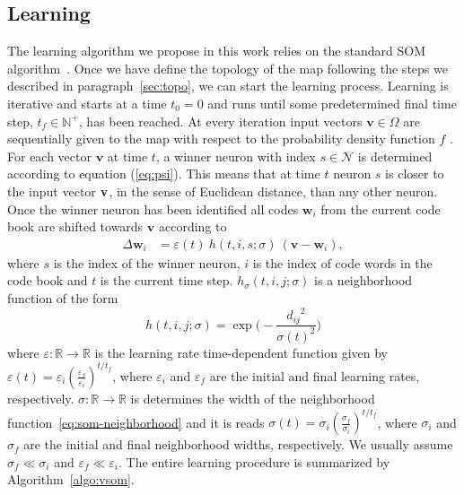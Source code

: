\subsection{Learning}

The learning algorithm we propose in this work relies on the standard SOM 
algorithm~\citep{Kohonen:1982}. Once we have define the topology of the map
following the steps we described in paragraph~\ref{sec:topo}, we can start 
the learning process. Learning is iterative and starts at a time $t_0=0$ and
runs until some predetermined final time step, $t_f \in \mathbb{N}^+$, has been 
reached. At every iteration input vectors $\mathbf{v} \in \Omega$ are 
sequentially given to the
map with respect to the probability density function $f$ .
For each vector $\mathbf{v}$ at time $t$, a winner neuron with index 
$s \in \mathcal{N}$ is determined according to equation (\ref{eq:psi}). This
means that at time $t$ neuron $s$ is closer to the input vector ${\bf v}$, in
the sense of Euclidean distance, than any other neuron. 
Once the winner neuron has been identified all codes $\mathbf{w}_{i}$ from the
current code book are shifted towards $\mathbf{v}$ according to
\begin{align}
\label{eq:som-learning}
    \Delta\mathbf{w}_{i} &= \varepsilon(t)~h(t,i,s;\sigma)~(\mathbf{v} - \mathbf{w}_i), 
\end{align}
where $s$ is the index of the winner neuron, $i$ is the index of code words
in the code book and $t$ is the current time step. $h_\sigma(t,i,j;\sigma)$ is
a neighborhood function of the form
\begin{equation}
  h(t,i,j; \sigma) = \exp\Big(-\frac{{d_{ij}}^2}{\sigma(t)^2}\Big)
  \label{eq:som-neighborhood}
\end{equation}
where $\varepsilon: \mathbb{R} \rightarrow \mathbb{R}$ is the learning rate
time-dependent function given by
$\varepsilon(t) = \varepsilon_i\left(\frac{\varepsilon_f}{\varepsilon_i}\right)^{t/t_f}$,
where $\varepsilon_i$ and $\varepsilon_f$ are the initial and final
learning rates, respectively.
$\sigma: \mathbb{R} \rightarrow \mathbb{R}$ is determines the width of the 
neighborhood function~\eqref{eq:som-neighborhood} and it is reads
$\sigma(t) = \sigma_i\left(\frac{\sigma_f}{\sigma_i}\right)^{t/t_f}$,
where $\sigma_i$ and $\sigma_f$ are the initial and final neighborhood widths,
respectively. We usually assume $\sigma_f \ll \sigma_i$ and 
$\varepsilon_f \ll \varepsilon_i$. The entire learning procedure is summarized
by Algorithm~\ref{algo:vsom}. 


